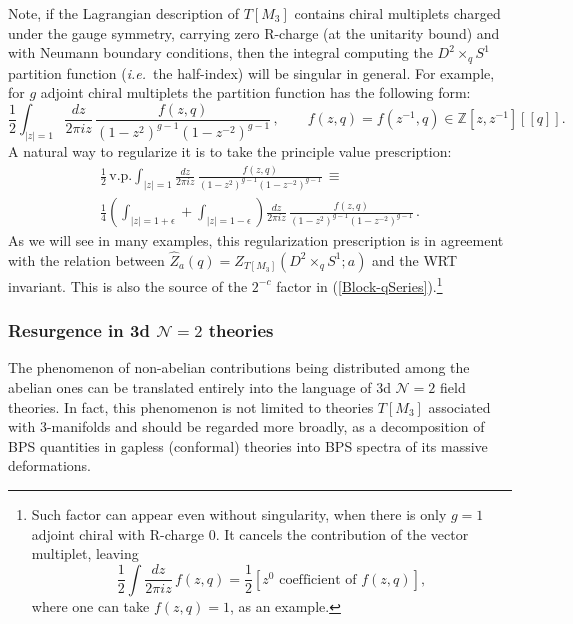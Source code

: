 \documentclass[hyper,letterpaper]{JHEP3}
\newcommand{\Z}{{\mathbb Z}}
\renewcommand{\hat}{\widehat}
\def\CN{{\mathcal N}}
\def\ie{{\textit{i.e.}}}
\begin{document}
Note, if the Lagrangian description of $T[M_3]$ contains chiral multiplets charged under the gauge symmetry, carrying zero R-charge (at the unitarity bound) and with Neumann boundary conditions, then the integral computing the $D^2\times_q S^1$ partition function (\ie~the half-index) will be singular in general. For example, for $g$ adjoint chiral multiplets the partition function has the following form:
\begin{equation}
	\frac{1}{2}\int_{|z|=1}\frac{dz}{2\pi i z}\,\frac{f(z,q)}{(1-z^2)^{g-1}(1-z^{-2})^{g-1}}\,,\qquad f(z,q)=f(z^{-1},q)\in \Z[z,z^{-1}][[q]].
\end{equation}
A natural way to regularize it is to take the principle value prescription:
\begin{multline}
	\frac{1}{2}\,\text{v.p.}\int_{|z|=1}\frac{dz}{2\pi i z}\,\frac{f(z,q)}{(1-z^2)^{g-1}(1-z^{-2})^{g-1}}\,\equiv\\
	\frac{1}{4}\left(\int_{|z|=1+\epsilon}+\int_{|z|=1-\epsilon}\right)\frac{dz}{2\pi i z}\,\frac{f(z,q)}{(1-z^2)^{g-1}(1-z^{-2})^{g-1}}\,.
\end{multline}
As we will see in many examples, this regularization prescription is in agreement with the relation between $\hat{Z}_a(q)=Z_{T[M_3]}(D^2\times_q S^1;a)$ and the WRT invariant. This is also the source of the $2^{-c}$ factor in (\ref{Block-qSeries}).\footnote{Such factor can appear even without singularity, when there is only $g=1$ adjoint chiral with R-charge 0. It cancels the contribution of the vector multiplet, leaving
\begin{equation}
	\frac{1}{2}\int \frac{dz}{2\pi i z}\,f(z,q)=\frac{1}{2}[z^0\text{ coefficient of }f(z,q)],
\end{equation}
where one can take $f(z,q)=1$, as an example.
}

\subsubsection*{Resurgence in 3d $\CN=2$ theories}

The phenomenon of non-abelian contributions being distributed among the abelian ones can be translated entirely into the language of 3d $\CN=2$ field theories. In fact, this phenomenon is not limited to theories $T[M_3]$ associated with 3-manifolds and should be regarded more broadly, as a decomposition of BPS quantities in gapless (conformal) theories into BPS spectra of its massive deformations.
\end{document}
